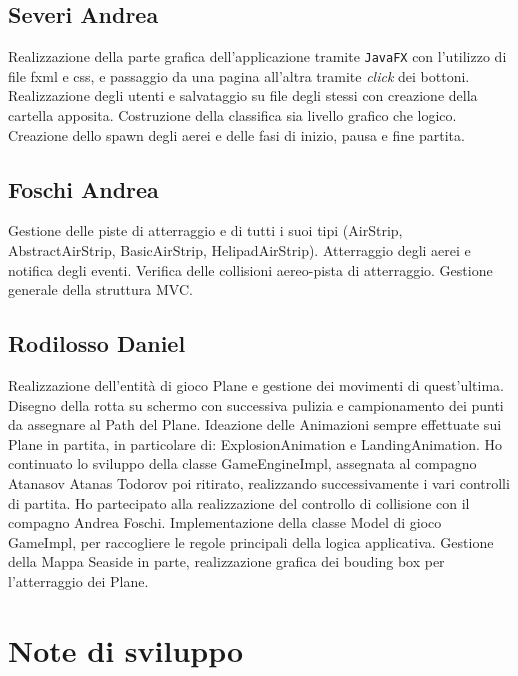 \documentclass[a4paper,12pt]{report}
\begin{document}
\subsection{Severi Andrea}
Realizzazione della parte grafica dell'applicazione tramite \texttt{JavaFX} con l'utilizzo di file fxml e css, e passaggio da una pagina all'altra tramite \textit{click} dei bottoni. 
\\
Realizzazione degli utenti e salvataggio su file degli stessi con creazione della cartella apposita. Costruzione della classifica sia livello grafico che logico. 
\\
Creazione dello spawn degli aerei e delle fasi di inizio, pausa e fine partita.

\subsection{Foschi Andrea}
Gestione delle piste di atterraggio e di tutti i suoi tipi (AirStrip, AbstractAirStrip, BasicAirStrip, HelipadAirStrip). Atterraggio degli aerei e notifica degli eventi. Verifica delle collisioni aereo-pista di atterraggio. Gestione generale della struttura MVC.

\subsection{Rodilosso Daniel}
Realizzazione dell’entità di gioco Plane e gestione dei movimenti di quest’ultima.
Disegno della rotta su schermo con successiva pulizia e campionamento dei punti da assegnare al Path del Plane.
Ideazione delle Animazioni sempre effettuate sui Plane in partita, in particolare di: ExplosionAnimation e LandingAnimation.
Ho continuato lo sviluppo della classe GameEngineImpl, assegnata al compagno Atanasov Atanas Todorov poi ritirato, realizzando successivamente i 
vari controlli di partita.
Ho partecipato alla realizzazione del controllo di collisione con il compagno Andrea Foschi.
Implementazione della classe Model di gioco GameImpl, per raccogliere le regole principali della logica applicativa.
Gestione della Mappa Seaside in parte, realizzazione grafica dei bouding box per l’atterraggio dei Plane.

\section{Note di sviluppo}
\end{document}
